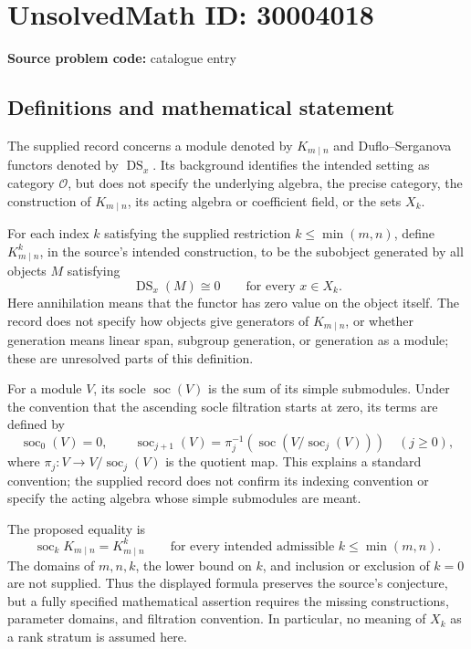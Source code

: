 \documentclass[11pt]{article}
\begin{document}
\section*{UnsolvedMath ID: 30004018}
\textbf{Source problem code:} catalogue entry
\subsection{Definitions and mathematical statement}
The supplied record concerns a module denoted by \(K_{m\mid n}\) and Duflo--Serganova functors denoted by \(\operatorname{DS}_x\). Its background identifies the intended setting as category \(\mathcal O\), but does not specify the underlying algebra, the precise category, the construction of \(K_{m\mid n}\), its acting algebra or coefficient field, or the sets \(X_k\).

For each index \(k\) satisfying the supplied restriction \(k\leq\min(m,n)\), define \(K^k_{m\mid n}\), in the source's intended construction, to be the subobject generated by all objects \(M\) satisfying
\[
\operatorname{DS}_x(M)\cong 0\qquad\text{for every }x\in X_k.
\]
Here annihilation means that the functor has zero value on the object itself. The record does not specify how objects give generators of \(K_{m\mid n}\), or whether generation means linear span, subgroup generation, or generation as a module; these are unresolved parts of this definition.

For a module \(V\), its socle \(\operatorname{soc}(V)\) is the sum of its simple submodules. Under the convention that the ascending socle filtration starts at zero, its terms are defined by
\[
\operatorname{soc}_0(V)=0,\qquad
\operatorname{soc}_{j+1}(V)=\pi_j^{-1}\!\left(\operatorname{soc}\!\left(V/\operatorname{soc}_j(V)\right)\right)
\quad(j\geq 0),
\]
where \(\pi_j:V\to V/\operatorname{soc}_j(V)\) is the quotient map. This explains a standard convention; the supplied record does not confirm its indexing convention or specify the acting algebra whose simple submodules are meant.

The proposed equality is
\[
\operatorname{soc}_k K_{m\mid n}=K^k_{m\mid n}
\qquad\text{for every intended admissible }k\leq\min(m,n).
\]
The domains of \(m,n,k\), the lower bound on \(k\), and inclusion or exclusion of \(k=0\) are not supplied. Thus the displayed formula preserves the source's conjecture, but a fully specified mathematical assertion requires the missing constructions, parameter domains, and filtration convention. In particular, no meaning of \(X_k\) as a rank stratum is assumed here.
\end{document}
